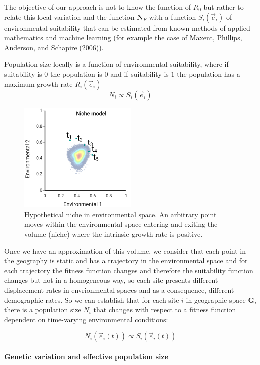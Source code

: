 \documentclass[
]{article}
\begin{document}
The objective of our approach is not to know the function of \(R_0\) but
rather to relate this local variation and the function \(\mathbf{N}_F\)
with a function \(S_i(\vec{e}_i)\) of environmental suitability that can
be estimated from known methods of applied mathematics and machine
learning (for example the case of Maxent, Phillips, Anderson, and
Schapire (2006)).

Population size locally is a function of environmental suitability,
where if suitability is \(0\) the population is \(0\) and if suitability
is \(1\) the population has a maximum growth rate \(R_i(\vec{e}_i)\) \[
N_i \propto  S_i(\vec{e}_i)
\]

\begin{figure}
\centering
\includegraphics[width=0.5\textwidth,height=\textheight]{all_figures/figure_1.png}
\caption{Hypothetical niche in environmental space. An arbitrary point
moves within the environmental space entering and exiting the volume
(niche) where the intrinsic growth rate is positive.}
\end{figure}

Once we have an approximation of this volume, we consider that each
point in the geography is static and has a trajectory in the
environmental space and for each trajectory the fitness function changes
and therefore the suitability function changes but not in a homogeneous
way, so each site presents different displacement rates in envrionmental
spaces and as a consequence, different demographic rates. So we can
establish that for each site \(i\) in geographic space \(\mathbf{G}\),
there is a population size \(N_i\) that changes with respect to a
fitness function dependent on time-varying environmental conditions:

\[
N_i(\vec{e}_i(t)) \propto  S_i(\vec{e}_i(t))
\]

\hypertarget{genetic-variation-and-effective-population-size}{%
\paragraph{Genetic variation and effective population
size}\label{genetic-variation-and-effective-population-size}}
\end{document}
